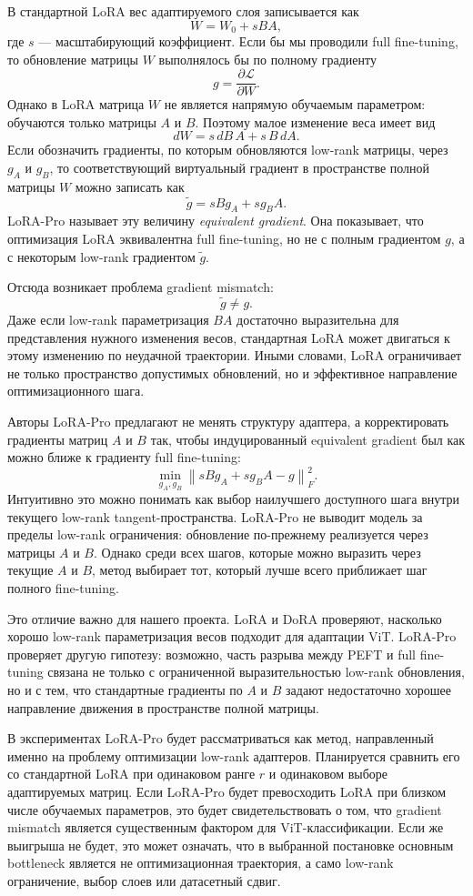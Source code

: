\documentclass[]{scrartcl}
\begin{document}
В стандартной LoRA вес адаптируемого слоя записывается как
\[
    W = W_0 + sBA,
\]
где $s$ --- масштабирующий коэффициент. Если бы мы проводили full fine-tuning,
то обновление матрицы $W$ выполнялось бы по полному градиенту
\[
    g = \frac{\partial \mathcal{L}}{\partial W}.
\]
Однако в LoRA матрица $W$ не является напрямую обучаемым параметром: обучаются
только матрицы $A$ и $B$. Поэтому малое изменение веса имеет вид
\[
    dW = s\,dB\,A + s\,B\,dA.
\]
Если обозначить градиенты, по которым обновляются low-rank матрицы, через
$g_A$ и $g_B$, то соответствующий виртуальный градиент в пространстве полной
матрицы $W$ можно записать как
\[
    \widetilde{g} = sBg_A + sg_BA.
\]
LoRA-Pro называет эту величину \textit{equivalent gradient}. Она показывает,
что оптимизация LoRA эквивалентна full fine-tuning, но не с полным градиентом
$g$, а с некоторым low-rank градиентом $\widetilde{g}$.

Отсюда возникает проблема gradient mismatch:
\[
    \widetilde{g} \neq g.
\]
Даже если low-rank параметризация $BA$ достаточно выразительна для представления
нужного изменения весов, стандартная LoRA может двигаться к этому изменению по
неудачной траектории. Иными словами, LoRA ограничивает не только пространство
допустимых обновлений, но и эффективное направление оптимизационного шага.

Авторы LoRA-Pro предлагают не менять структуру адаптера, а корректировать градиенты
матриц $A$ и $B$ так, чтобы индуцированный equivalent gradient был как можно
ближе к градиенту full fine-tuning:
\[
    \min_{g_A,g_B}
    \left\|sBg_A + sg_BA - g\right\|_F^2.
\]
Интуитивно это можно понимать как выбор наилучшего доступного шага внутри
текущего low-rank tangent-пространства. LoRA-Pro не выводит модель за пределы
low-rank ограничения: обновление по-прежнему реализуется через матрицы $A$ и
$B$. Однако среди всех шагов, которые можно выразить через текущие $A$ и $B$,
метод выбирает тот, который лучше всего приближает шаг полного fine-tuning.

Это отличие важно для нашего проекта. LoRA и DoRA проверяют, насколько хорошо
low-rank параметризация весов подходит для адаптации ViT. LoRA-Pro проверяет
другую гипотезу: возможно, часть разрыва между PEFT и full fine-tuning связана
не только с ограниченной выразительностью low-rank обновления, но и с тем, что
стандартные градиенты по $A$ и $B$ задают недостаточно хорошее направление
движения в пространстве полной матрицы.

В экспериментах LoRA-Pro будет рассматриваться как метод, направленный именно
на проблему оптимизации low-rank адаптеров. Планируется сравнить его со
стандартной LoRA при одинаковом ранге $r$ и одинаковом выборе адаптируемых
матриц. Если LoRA-Pro будет превосходить LoRA при близком числе обучаемых
параметров, это будет свидетельствовать о том, что gradient mismatch является
существенным фактором для ViT-классификации. Если же выигрыша не будет, это
может означать, что в выбранной постановке основным bottleneck является не
оптимизационная траектория, а само low-rank ограничение, выбор слоев или
датасетный сдвиг.
\end{document}
